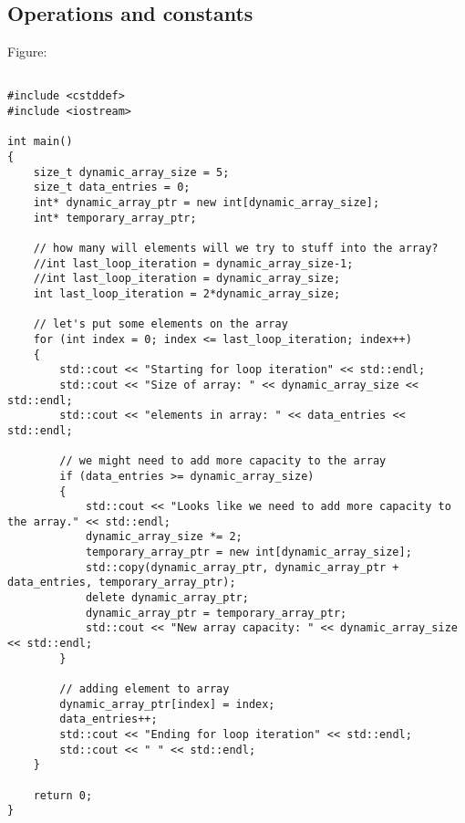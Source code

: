 \documentclass[11pt,a4paper,english]{paper}
\begin{document}
 \bigskip  

 \subsection{Operations and constants}

\bigskip

\begin{bbox} {Figure: } {


  \begin{verbatim}

#include <cstddef>
#include <iostream>

int main()
{
    size_t dynamic_array_size = 5;
    size_t data_entries = 0;
    int* dynamic_array_ptr = new int[dynamic_array_size];
    int* temporary_array_ptr;

    // how many will elements will we try to stuff into the array?
    //int last_loop_iteration = dynamic_array_size-1;
    //int last_loop_iteration = dynamic_array_size;
    int last_loop_iteration = 2*dynamic_array_size;

    // let's put some elements on the array
    for (int index = 0; index <= last_loop_iteration; index++)
    {
        std::cout << "Starting for loop iteration" << std::endl;
        std::cout << "Size of array: " << dynamic_array_size << std::endl;
        std::cout << "elements in array: " << data_entries << std::endl;

        // we might need to add more capacity to the array
        if (data_entries >= dynamic_array_size)
        {
            std::cout << "Looks like we need to add more capacity to the array." << std::endl;
            dynamic_array_size *= 2;
            temporary_array_ptr = new int[dynamic_array_size];
            std::copy(dynamic_array_ptr, dynamic_array_ptr + data_entries, temporary_array_ptr);
            delete dynamic_array_ptr;
            dynamic_array_ptr = temporary_array_ptr;
            std::cout << "New array capacity: " << dynamic_array_size << std::endl;
        }

        // adding element to array
        dynamic_array_ptr[index] = index;
        data_entries++;
        std::cout << "Ending for loop iteration" << std::endl;
        std::cout << " " << std::endl;
    }

    return 0;
}

  \end{verbatim}


}\end{bbox}
\end{document}
